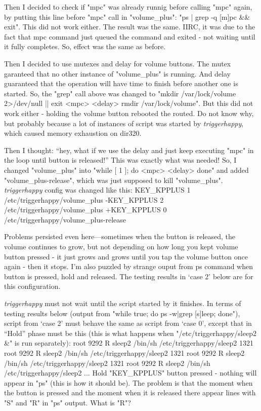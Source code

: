 Then I decided to check if "mpc" was already runnig before calling "mpc"
again, by putting this line before "mpc" call in "volume_plus":
"ps | grep -q [m]pc && exit". This did not work either. The result was
the same. IIRC, it was due to the fact that mpc command just queued the
command and exited - not waiting until it fully completes. So, effect
was the same as before.

Then I decided to use mutexes and delay for volume buttons.
The mutex garanteed that no other instance of "volume_plus" is running.
And delay guaranteed that the operation will have time to finish before
another one is started. So, the "grep" call above was changed to
"mkdir /var/lock/volume 2>/dev/null || exit <mpc> <delay>
rmdir /var/lock/volume". But this did not work either - holding the
volume button rebooted the routed. Do not know why, but probably because
a lot of instances of script was started by {\sl triggerhappy\/}, which
caused memory exhaustion on dir320.

Then I thought: ``hey, what if we use the delay and just keep executing
"mpc" in the loop until button is released!'' This was exactly what
was needed! So, I changed "volume_plus" into "while [ 1 ]; do <mpc>
<delay> done" and added "volume_plus-release", which was just supposed
to kill "volume_plus". {\sl triggerhappy\/} config was changed like this:
\begtt
 KEY_KPPLUS 1 /etc/triggerhappy/volume_plus
-KEY_KPPLUS 2 /etc/triggerhappy/volume_plus
+KEY_KPPLUS 0 /etc/triggerhappy/volume_plus-release
\endtt

Problems persisted even here---sometimes when the button is released,
the volume continues to grow, but not depending on how long you kept
volume button pressed - it just grows and grows until you tap the
volume button once again - then it stops. I'm also puzzled by strange
ouput from ps command when button is pressed, hold and released.
The testing results in `case 2' below are for this configuration.

{\sl triggerhappy\/} must not wait until the script started by it finishes.
In terms of testing results below (output from
"while true; do ps -w|grep [s]leep; done"), script from `case 2' must behave
the same as script from `case 0', except
that in ``Hold'' phase must be this
(this is what happens when "/etc/triggerhappy/sleep2 &" is run separately):
 root      9292 R    {sleep2} /bin/sh /etc/triggerhappy/sleep2
 1321 root      9292 R    {sleep2} /bin/sh /etc/triggerhappy/sleep2
 1321 root      9292 R    {sleep2} /bin/sh /etc/triggerhappy/sleep2
 1321 root      9292 R    {sleep2} /bin/sh /etc/triggerhappy/sleep2
...
\endtt
\medskip
{}
Hold "KEY_KPPLUS"
button pressed - nothing will appear in "ps" (this is how it should be).
The problem is that the moment when the button is pressed and the
moment when it is released there appear lines with "S" and "R" in
"ps" output. What is "R"?

